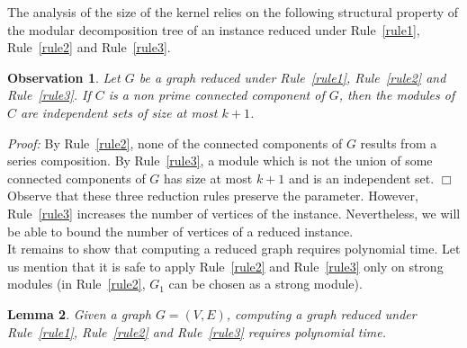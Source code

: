 \documentclass[11pt]{article}
\newenvironment{proof}{\noindent\textit{Proof: }}{{\hfill $\Box$}}
\newtheorem{lemma}{Lemma}[section]
\newtheorem{observation}[lemma]{Observation}
\begin{document}
The analysis of the size of the kernel relies on the following structural property of the modular decomposition tree of an instance reduced under Rule~\ref{rule1}, Rule~\ref{rule2} and Rule~\ref{rule3}.

\begin{observation} \label{obs:reduced-123}
Let $G$ be a graph reduced under Rule~\ref{rule1}, Rule~\ref{rule2} and Rule~\ref{rule3}. If $C$ is a non prime connected component of $G$, then the modules of $C$ are independent sets of size at most $k+1$.
\end{observation}

\begin{proof}
By Rule~\ref{rule2}, none of the connected components of $G$ results from a series composition. By Rule~\ref{rule3}, a module which is not the union of some connected components of $G$ has size at most $k+1$ and is an independent set.
\end{proof}\\

Observe that these three reduction rules preserve the parameter. However, Rule~\ref{rule3} increases the number of vertices of the instance. Nevertheless, we will be able to bound the number of vertices of a reduced instance. \\

It remains to show that computing a reduced graph requires polynomial time. Let us mention that it is safe to apply Rule~\ref{rule2} and Rule~\ref{rule3} only on strong modules (in Rule~\ref{rule2}, $G_1$ can be chosen as a strong module).  

\begin{lemma} \label{lem:gen-reduced}
Given a graph $G=(V,E)$, computing a graph reduced under Rule~\ref{rule1}, Rule~\ref{rule2} and Rule~\ref{rule3} requires polynomial time.
\end{lemma}
\end{document}
